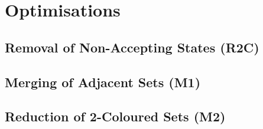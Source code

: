 





\section{Optimisations}
\label{3_optimisations}
\subsection{Removal of Non-Accepting States (R2C)}
\subsection{Merging of Adjacent Sets (M1)}
\subsection{Reduction of 2-Coloured Sets (M2)}

